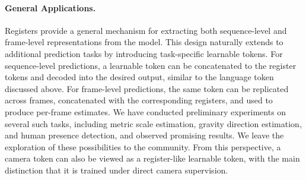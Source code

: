 \paragraph{General Applications.}

Registers provide a general mechanism for extracting both sequence-level and frame-level representations from the model.
This design naturally extends to additional prediction tasks by introducing task-specific learnable tokens.
For sequence-level predictions, a learnable token can be concatenated to the register tokens and decoded into the desired output, similar to the language token discussed above.
For frame-level predictions, the same token can be replicated across frames, concatenated with the corresponding registers, and used to produce per-frame estimates.
We have conducted preliminary experiments on several such tasks, including metric scale estimation, gravity direction estimation, and human presence detection, and observed promising results.
We leave the exploration of these possibilities to the community.
From this perspective, a camera token can also be viewed as a register-like learnable token, with the main distinction that it is trained under direct camera supervision.












